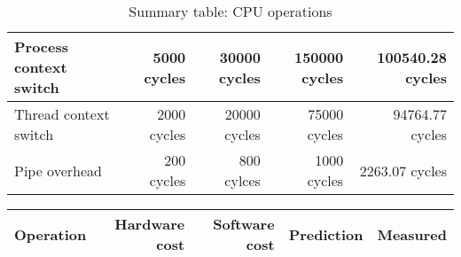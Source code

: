 \begin{table}[h]
\begin{center}
\begin{tabular}{| l | r | r | r | r |}
Process context switch 	& 5000 cycles	& 30000 cycles	& 150000 cycles	& 100540.28 cycles \\ \hline
Thread context switch 	& 2000 cycles	& 20000 cycles	& 75000 cycles	& 94764.77 cycles \\ \hline
Pipe overhead		& 200 cycles	& 800 cylces	& 1000 cycles	& 2263.07 cycles \\ \hline

\end{tabular}
\end{center}

\caption{Summary table: CPU operations}

\end{table}

\begin{table}[h]
\begin{center}
\begin{tabular}{| l | r | r | r | r |} \hline
Operation 			& Hardware cost 	& Software cost 	& Prediction	& Measured \\ \hline


\end{tabular}
\end{center}
\end{table}
